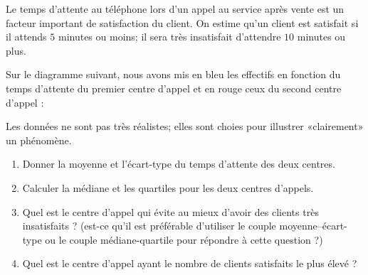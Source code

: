 
\begin{exercice}\label{exosmath-0247}

    Le temps d'attente au téléphone lors d'un appel au service après vente est un facteur important de satisfaction du client. On estime qu'un client est satisfait si il attends \( 5\) minutes ou moins; il sera très insatisfait d'attendre \( 10\) minutes ou plus.

    Sur le diagramme suivant, nous avons mis en bleu les effectifs en fonction du temps d'attente du premier centre d'appel et en rouge ceux du second centre d'appel :

    \begin{center}

    \end{center}
    Les données ne sont pas très réalistes; elles sont choies pour illustrer «clairement» un phénomène.

    \begin{enumerate}
        \item
            Donner la moyenne et l'écart-type du temps d'attente des deux centres.
        \item
            Calculer la médiane et les quartiles pour les deux centres d'appels.
        \item
            Quel est le centre d'appel qui évite au mieux d'avoir des clients très insatisfaits ? (est-ce qu'il est préférable d'utiliser le couple moyenne--écart-type ou le couple médiane-quartile pour répondre à cette question ?)
        \item
            Quel est le centre d'appel ayant le nombre de clients satisfaits le plus élevé ?
    \end{enumerate}

\end{exercice}
